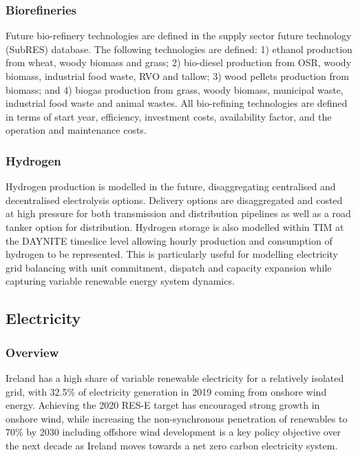 \documentclass[gmd,manuscript]{copernicus}
\begin{document}
\subsubsection{Biorefineries}
Future bio-refinery technologies are defined in the supply sector future technology (SubRES) database. The following technologies are defined: 1) ethanol production from wheat, woody biomass and grass; 2) bio-diesel production from OSR, woody biomass, industrial food waste, RVO and tallow; 3) wood pellets production from biomass; and 4) biogas production from grass, woody biomass, municipal waste, industrial food waste and animal wastes. All bio-refining technologies are defined in terms of start year, efficiency, investment costs, availability factor, and the operation and maintenance costs.

\subsubsection{Hydrogen}
Hydrogen production is modelled in the future, disaggregating centralised and decentralised electrolysis options. Delivery options are disaggregated and costed at high pressure for both transmission and distribution pipelines as well as a road tanker option for distribution. Hydrogen storage is also modelled within TIM at the DAYNITE timeslice level allowing hourly production and consumption of hydrogen to be represented. This is particularly useful for modelling electricity grid balancing with unit commitment, dispatch and capacity expansion while capturing variable renewable energy system dynamics.

\subsection{Electricity}
\label{ss:power}

\subsubsection{Overview}
Ireland has a high share of variable renewable electricity for a relatively isolated grid, with 32.5\% of electricity generation in 2019 coming from onshore wind energy. Achieving the 2020 RES-E target has encouraged strong growth in onshore wind, while increasing the non-synchronous penetration of renewables to 70\% by 2030 including offshore wind development is a key policy objective over the next decade as Ireland moves towards a net zero carbon electricity system. 
\end{document}
